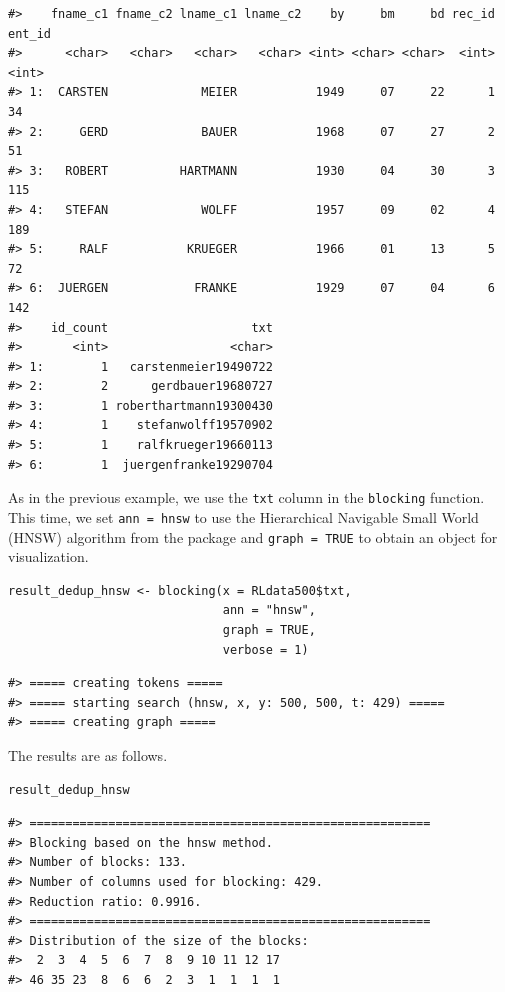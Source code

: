 \begin{verbatim}
#>    fname_c1 fname_c2 lname_c1 lname_c2    by     bm     bd rec_id ent_id
#>      <char>   <char>   <char>   <char> <int> <char> <char>  <int>  <int>
#> 1:  CARSTEN             MEIER           1949     07     22      1     34
#> 2:     GERD             BAUER           1968     07     27      2     51
#> 3:   ROBERT          HARTMANN           1930     04     30      3    115
#> 4:   STEFAN             WOLFF           1957     09     02      4    189
#> 5:     RALF           KRUEGER           1966     01     13      5     72
#> 6:  JUERGEN            FRANKE           1929     07     04      6    142
#>    id_count                    txt
#>       <int>                 <char>
#> 1:        1   carstenmeier19490722
#> 2:        2      gerdbauer19680727
#> 3:        1 roberthartmann19300430
#> 4:        1    stefanwolff19570902
#> 5:        1    ralfkrueger19660113
#> 6:        1  juergenfranke19290704
\end{verbatim}

As in the previous example, we use the \texttt{txt} column in the \texttt{blocking} function. This time, we set \texttt{ann\ =\ hnsw} to use the Hierarchical Navigable Small World (HNSW) algorithm from the  package and \texttt{graph\ =\ TRUE} to obtain an  object for visualization.

\begin{verbatim}
result_dedup_hnsw <- blocking(x = RLdata500$txt,
                              ann = "hnsw",
                              graph = TRUE,
                              verbose = 1)
\end{verbatim}

\begin{verbatim}
#> ===== creating tokens =====
#> ===== starting search (hnsw, x, y: 500, 500, t: 429) =====
#> ===== creating graph =====
\end{verbatim}

The results are as follows.

\begin{verbatim}
result_dedup_hnsw
\end{verbatim}

\begin{verbatim}
#> ========================================================
#> Blocking based on the hnsw method.
#> Number of blocks: 133.
#> Number of columns used for blocking: 429.
#> Reduction ratio: 0.9916.
#> ========================================================
#> Distribution of the size of the blocks:
#>  2  3  4  5  6  7  8  9 10 11 12 17 
#> 46 35 23  8  6  6  2  3  1  1  1  1
\end{verbatim}

